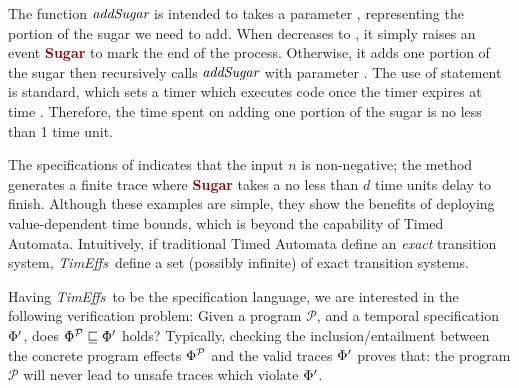 \documentclass[acmsmall,10pt,review]{acmart}
\newcommand{\timedEffects}{\emph{TimEffs}}
\newcommand{\effect}{\textcolor{black}{\ensuremath{\mathrm{\Phi}}}}
\newcommand{\anyevent}[1]{{\textcolor{darkred}
{{\textbf{\footnotesize #1}}}}}
\newcommand{\code}[1]{{\tt{\ensuremath{\m{#1}}}}}
\newcommand{\CONTAIN}{\sqsubseteq}
\newcommand{\m}{\mathit}
\def\defeq{\ensuremath{\,\triangleq}}
\begin{document}
The function 
\code{\emph{addSugar}} is intended to takes a parameter , representing 
the portion of the sugar we need to add. When  decreases to , 
it simply raises an event \anyevent{Sugar} to mark the end of the process. 
Otherwise, it adds one portion of the sugar then recursively calls \code{\emph{addSugar}} with parameter . 
The use of statement  is standard, 
which sets a timer which executes code  once the timer 
expires at time . 
Therefore, the time spent on adding one portion of the sugar is 
no less than 1 time unit. 


The specifications of   indicates that the 
input  \code{n} is non-negative; the method 
generates a finite trace where \anyevent{Sugar} takes a no less 
than \code{d} time units delay to finish. 
Although these examples are simple, they show the benefits of deploying 
value-dependent 
time bounds, which is beyond the capability of Timed Automata. Intuitively, if traditional Timed Automata define an 
\emph{exact} transition system, \timedEffects\ define 
a set (possibly infinite) of exact transition systems. 
 
   

Having \timedEffects\ to be  the specification language, we are interested in the following verification problem: 
Given a program \code{\mathcal{P}},
and a temporal specification \code{\effect^{\prime}}, does 
\code{\effect^{\mathcal{P}} \CONTAIN \effect^{\prime}} holds? Typically, 
checking the inclusion/entailment between the concrete program effects \code{\effect^{\mathcal{P}}} and the valid traces \code{\effect^{\prime}} proves that: the program \code{\mathcal{P}} will never lead to unsafe traces which violate \code{\effect^{\prime}}.
\end{document}
